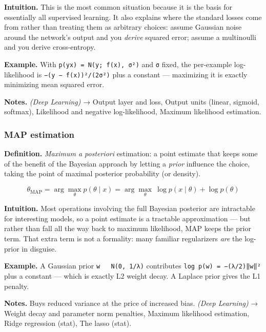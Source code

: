 \documentclass[
  10pt,
  letterpaper,
  onecolumn]{article}
\begin{document}
\textbf{Intuition.} This is the most common situation because it is the
basis for essentially all supervised learning. It also explains where
the standard losses come from rather than treating them as arbitrary
choices: assume Gaussian noise around the network's output and you
\emph{derive} squared error; assume a multinoulli and you derive
cross-entropy.

\textbf{Example.} With
\texttt{p(y\textbar{}x)\ =\ N(y;\ f(x),\ σ²)} and \texttt{σ} fixed, the
per-example log-likelihood is
\texttt{−(y\ −\ f(x))²/(2σ²)} plus a constant --- maximizing it is
exactly minimizing mean squared error.

\textbf{Notes.} \emph{(Deep Learning)} → Output layer and loss, Output
units (linear, sigmoid, softmax), Likelihood and negative
log-likelihood, Maximum likelihood estimation.

\hypertarget{map-estimation}{%
\subsubsection{MAP estimation}\label{map-estimation}}

\textbf{Definition.} \emph{Maximum a posteriori} estimation: a point
estimate that keeps some of the benefit of the Bayesian approach by
letting a \emph{prior} influence the choice, taking the point of maximal
posterior probability (or density).

\begin{equation*}
\theta_{\text{MAP}}=\arg\max_{\theta}p(\theta\mid x)=\arg\max_{\theta}\ \log p(x\mid\theta)+\log p(\theta)
\end{equation*}

\textbf{Intuition.} Most operations involving the full Bayesian
posterior are intractable for interesting models, so a point estimate is
a tractable approximation --- but rather than fall all the way back to
maximum likelihood, MAP keeps the prior term. That extra term is not a
formality: many familiar regularizers \emph{are} the log-prior in
disguise.

\textbf{Example.} A Gaussian prior
\texttt{w\ ~\ N(0,\ 1/λ)} contributes
\texttt{log\ p(w)\ =\ −(λ/2)‖w‖²} plus a constant --- which is exactly
L2 weight decay. A Laplace prior gives the L1 penalty.

\textbf{Notes.} Buys reduced variance at the price of increased bias.
\emph{(Deep Learning)} → Weight decay and parameter norm penalties,
Maximum likelihood estimation, Ridge regression (stat), The lasso
(stat).
\end{document}
